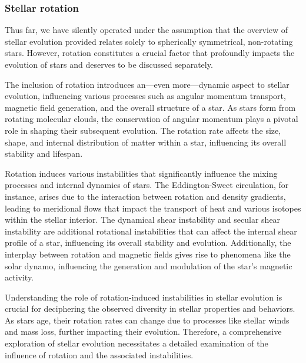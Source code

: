 \documentclass[main.tex]{subfiles}
\begin{document}
    

    \subsubsection{Stellar rotation}
    Thus far, we have silently operated under the assumption that the overview of stellar evolution provided relates solely to spherically symmetrical, non-rotating stars. However, rotation constitutes a crucial factor that profoundly impacts the evolution of stars and deserves to be discussed separately. 

    The inclusion of rotation introduces an---even more---dynamic aspect to stellar evolution, influencing various processes such as angular momentum transport, magnetic field generation, and the overall structure of a star. As stars form from rotating molecular clouds, the conservation of angular momentum plays a pivotal role in shaping their subsequent evolution. The rotation rate affects the size, shape, and internal distribution of matter within a star, influencing its overall stability and lifespan.

    Rotation induces various instabilities that significantly influence the mixing processes and internal dynamics of stars. The Eddington-Sweet circulation, for instance, arises due to the interaction between rotation and density gradients, leading to meridional flows that impact the transport of heat and various isotopes within the stellar interior. The dynamical shear instability and secular shear instability are additional rotational instabilities that can affect the internal shear profile of a star, influencing its overall stability and evolution. Additionally, the interplay between rotation and magnetic fields gives rise to phenomena like the solar dynamo, influencing the generation and modulation of the star's magnetic activity.

    Understanding the role of rotation-induced instabilities in stellar evolution is crucial for deciphering the observed diversity in stellar properties and behaviors. As stars age, their rotation rates can change due to processes like stellar winds and mass loss, further impacting their evolution. Therefore, a comprehensive exploration of stellar evolution necessitates a detailed examination of the influence of rotation and the associated instabilities.
\end{document}
